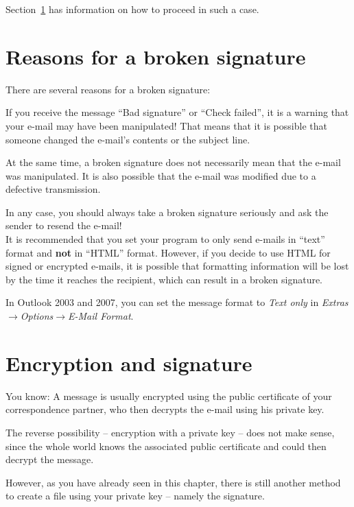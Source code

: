 \documentclass[a4paper,11pt,oneside,openright,titlepage]{scrbook}
\newcommand{\Menu}[1]{\textit{#1}}
\newcommand{\Email}{e-mail}
\begin{document}
Section~\ref{sec_brokenSignature} has information on how to proceed in
such a case.

\clearpage
\section{Reasons for a broken signature}
\label{sec_brokenSignature}

There are several reasons for a broken signature:

If you receive the message ``Bad signature'' or ``Check failed'', it
is a warning that your \Email{} may have been manipulated! That means
that it is possible that someone changed the \Email{}'s contents or
the subject line.

At the same time, a broken signature does not necessarily mean that
the \Email{} was manipulated. It is also possible that the \Email{}
was modified due to a defective transmission.

In any case, you should always take a broken signature seriously and
ask the sender to resend the \Email{}!\\

It is recommended that you set your program to only send \Email{}s in
``text'' format and \textbf{not} in ``HTML'' format. However, if you
decide to use HTML for signed or encrypted \Email{}s, it is possible
that formatting information will be lost by the time it reaches the
recipient, which can result in a broken signature.

In Outlook 2003 and 2007, you can set the message format to \Menu{Text
only} in
\Menu{Extras$\rightarrow$Options$\rightarrow$E-Mail Format}.


\clearpage
\section{Encryption and signature}
\label{sec_encsig}

You know: A message is usually encrypted using the public certificate
of your correspondence partner, who then decrypts the \Email{} using
his private key.

The reverse possibility -- encryption with a private key -- does not
make sense, since the whole world knows the associated public
certificate and could then decrypt the message.

However, as you have already seen in this chapter, there is still
another method to create a file using your private key -- namely the
signature.
\end{document}
